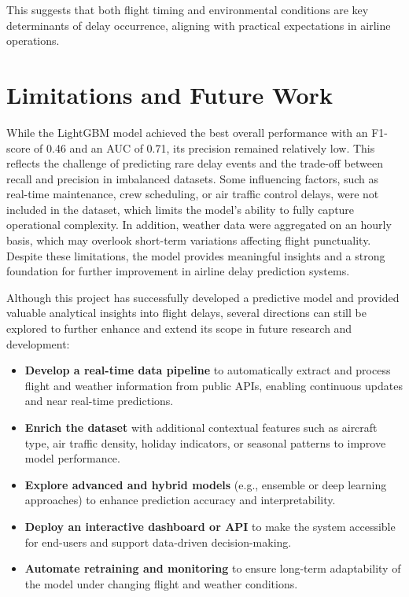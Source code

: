 \documentclass[a4paper,12pt]{report}
\begin{document}
This suggests that both flight timing and environmental conditions are key determinants of delay occurrence, aligning with practical expectations in airline operations.

\section{Limitations and Future Work}
While the LightGBM model achieved the best overall performance with an F1-score of 0.46 and an AUC of 0.71, its precision remained relatively low. This reflects the challenge of predicting rare delay events and the trade-off between recall and precision in imbalanced datasets. Some influencing factors, such as real-time maintenance, crew scheduling, or air traffic control delays, were not included in the dataset, which limits the model’s ability to fully capture operational complexity. In addition, weather data were aggregated on an hourly basis, which may overlook short-term variations affecting flight punctuality. Despite these limitations, the model provides meaningful insights and a strong foundation for further improvement in airline delay prediction systems.


Although this project has successfully developed a predictive model and provided valuable analytical insights into flight delays, several directions can still be explored to further enhance and extend its scope in future research and development:

\begin{itemize}
    \item \textbf{Develop a real-time data pipeline} to automatically extract and process flight and weather information from public APIs, enabling continuous updates and near real-time predictions.
    \item \textbf{Enrich the dataset} with additional contextual features such as aircraft type, air traffic density, holiday indicators, or seasonal patterns to improve model performance.
    \item \textbf{Explore advanced and hybrid models} (e.g., ensemble or deep learning approaches) to enhance prediction accuracy and interpretability.
    \item \textbf{Deploy an interactive dashboard or API} to make the system accessible for end-users and support data-driven decision-making.
    \item \textbf{Automate retraining and monitoring} to ensure long-term adaptability of the model under changing flight and weather conditions.
\end{itemize}
\end{document}
